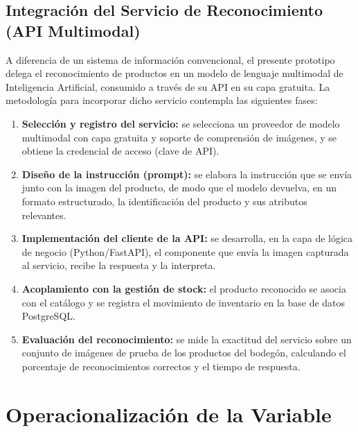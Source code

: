 \documentclass[12pt, letterpaper]{report}
\begin{document}
\subsection{Integración del Servicio de Reconocimiento (API
Multimodal)}

A diferencia de un sistema de información convencional, el presente
prototipo delega el reconocimiento de productos en un modelo de lenguaje
multimodal de Inteligencia Artificial, consumido a través de su API en
su capa gratuita. La metodología para incorporar dicho servicio
contempla las siguientes fases:

\begin{enumerate}
  \item \textbf{Selección y registro del servicio:} se selecciona un
        proveedor de modelo multimodal con capa gratuita y soporte de
        comprensión de imágenes, y se obtiene la credencial de acceso
        (clave de API).

  \item \textbf{Diseño de la instrucción (prompt):} se elabora la
        instrucción que se envía junto con la imagen del producto, de
        modo que el modelo devuelva, en un formato estructurado, la
        identificación del producto y sus atributos relevantes.

  \item \textbf{Implementación del cliente de la API:} se desarrolla, en
        la capa de lógica de negocio (Python/FastAPI), el componente que
        envía la imagen capturada al servicio, recibe la respuesta y la
        interpreta.

  \item \textbf{Acoplamiento con la gestión de stock:} el producto
        reconocido se asocia con el catálogo y se registra el
        movimiento de inventario en la base de datos PostgreSQL.

  \item \textbf{Evaluación del reconocimiento:} se mide la exactitud del
        servicio sobre un conjunto de imágenes de prueba de los
        productos del bodegón, calculando el porcentaje de
        reconocimientos correctos y el tiempo de respuesta.
\end{enumerate}

\section{Operacionalización de la Variable}
\end{document}

